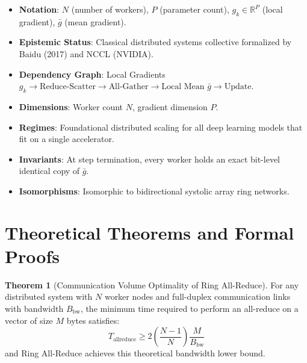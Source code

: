 \documentclass[11pt,a4paper]{article}
\theoremstyle{definition}
\newtheorem{theorem}{\textbf{Theorem}}[section]
\begin{document}
\begin{itemize}
    \item \textbf{Notation}: $N$ (number of workers), $P$ (parameter count), $g_k \in \mathbb{R}^P$ (local gradient), $\bar{g}$ (mean gradient).
    \item \textbf{Epistemic Status}: Classical distributed systems collective formalized by Baidu (2017) and NCCL (NVIDIA).
    \item \textbf{Dependency Graph}: Local Gradients $g_k \to \text{Reduce-Scatter} \to \text{All-Gather} \to \text{Local Mean } \bar{g} \to \text{Update}$.
    \item \textbf{Dimensions}: Worker count $N$, gradient dimension $P$.
    \item \textbf{Regimes}: Foundational distributed scaling for all deep learning models that fit on a single accelerator.
    \item \textbf{Invariants}: At step termination, every worker holds an exact bit-level identical copy of $\bar{g}$.
    \item \textbf{Isomorphisms}: Isomorphic to bidirectional systolic array ring networks.
\end{itemize}

\section{Theoretical Theorems and Formal Proofs}

\begin{theorem}[Communication Volume Optimality of Ring All-Reduce]
For any distributed system with $N$ worker nodes and full-duplex communication links with bandwidth $B_{\text{bw}}$, the minimum time required to perform an all-reduce on a vector of size $M$ bytes satisfies:
{\boldmath
\begin{equation}
T_{\text{allreduce}} \ge 2 \left( \frac{N - 1}{N} \right) \frac{M}{B_{\text{bw}}}
\end{equation}
}
and Ring All-Reduce achieves this theoretical bandwidth lower bound.
\end{theorem}
\end{document}
